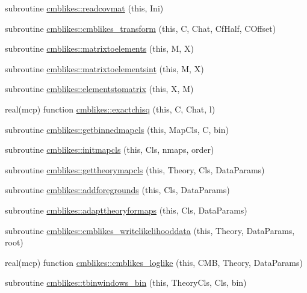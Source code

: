 \begin{DoxyCompactItemize}
\item 
subroutine \mbox{\hyperlink{namespacecmblikes_a53d98d3cf4a8d20dca8c46be7bd33329}{cmblikes\+::readcovmat}} (this, Ini)
\item 
subroutine \mbox{\hyperlink{namespacecmblikes_a94f791a78bfa0b35f813dc792796de0d}{cmblikes\+::cmblikes\+\_\+transform}} (this, C, Chat, Cf\+Half, C\+Offset)
\item 
subroutine \mbox{\hyperlink{namespacecmblikes_a16be2c18f3fecf43964ef1f2995dcd4e}{cmblikes\+::matrixtoelements}} (this, M, X)
\item 
subroutine \mbox{\hyperlink{namespacecmblikes_a908a9bb9c69b1ef3a8b7df6519fd4641}{cmblikes\+::matrixtoelementsint}} (this, M, X)
\item 
subroutine \mbox{\hyperlink{namespacecmblikes_a2ae7731bcaed3a30ef1314fdb6c7718e}{cmblikes\+::elementstomatrix}} (this, X, M)
\item 
real(mcp) function \mbox{\hyperlink{namespacecmblikes_a5ece500a732974850cb05902f8df7f16}{cmblikes\+::exactchisq}} (this, C, Chat, l)
\item 
subroutine \mbox{\hyperlink{namespacecmblikes_aeac358ca50ccdbdddc8f40af418cc6e5}{cmblikes\+::getbinnedmapcls}} (this, Map\+Cls, C, bin)
\item 
subroutine \mbox{\hyperlink{namespacecmblikes_a324d03e811c50f8dcc382819daa2adac}{cmblikes\+::initmapcls}} (this, Cls, nmaps, order)
\item 
subroutine \mbox{\hyperlink{namespacecmblikes_a887e1b2647525630e45abcf6e96ffb13}{cmblikes\+::gettheorymapcls}} (this, Theory, Cls, Data\+Params)
\item 
subroutine \mbox{\hyperlink{namespacecmblikes_a6653a1b9a17f3c0c4d5025a40de7d134}{cmblikes\+::addforegrounds}} (this, Cls, Data\+Params)
\item 
subroutine \mbox{\hyperlink{namespacecmblikes_a3015ed6ed745619906f28edd67ff390c}{cmblikes\+::adapttheoryformaps}} (this, Cls, Data\+Params)
\item 
subroutine \mbox{\hyperlink{namespacecmblikes_a9befa7145c3914eb9bdd86699681274c}{cmblikes\+::cmblikes\+\_\+writelikelihooddata}} (this, Theory, Data\+Params, root)
\item 
real(mcp) function \mbox{\hyperlink{namespacecmblikes_a97fb12e9b7c8a1059a8443b1b0423c24}{cmblikes\+::cmblikes\+\_\+loglike}} (this, C\+MB, Theory, Data\+Params)
\item 
subroutine \mbox{\hyperlink{namespacecmblikes_a84faea71532b47138544e07bf77a7fb0}{cmblikes\+::tbinwindows\+\_\+bin}} (this, Theory\+Cls, Cls, bin)
\end{DoxyCompactItemize}

